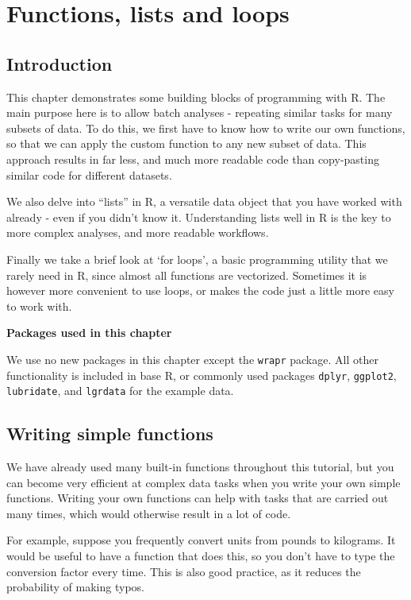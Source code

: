 \documentclass[]{book}
\begin{document}
\hypertarget{programming}{%
\chapter{Functions, lists and loops}\label{programming}}

\hypertarget{introduction-3}{%
\section{Introduction}\label{introduction-3}}

This chapter demonstrates some building blocks of programming with R. The main purpose here is to allow batch analyses - repeating similar tasks for many subsets of data. To do this, we first have to know how to write our own functions, so that we can apply the custom function to any new subset of data. This approach results in far less, and much more readable code than copy-pasting similar code for different datasets.

We also delve into ``lists'' in R, a versatile data object that you have worked with already - even if you didn't know it. Understanding lists well in R is the key to more complex analyses, and more readable workflows.

Finally we take a brief look at `for loops', a basic programming utility that we rarely need in R, since almost all functions are vectorized. Sometimes it is however more convenient to use loops, or makes the code just a little more easy to work with.

\textbf{Packages used in this chapter}

We use no new packages in this chapter except the \texttt{wrapr} package. All other functionality is included in base R, or commonly used packages \texttt{dplyr}, \texttt{ggplot2}, \texttt{lubridate}, and \texttt{lgrdata} for the example data.

\hypertarget{writefunctions}{%
\section{Writing simple functions}\label{writefunctions}}

We have already used many built-in functions throughout this tutorial, but you can become very efficient at complex data tasks when you write your own simple functions. Writing your own functions can help with tasks that are carried out many times, which would otherwise result in a lot of code.

For example, suppose you frequently convert units from pounds to kilograms. It would be useful to have a function that does this, so you don't have to type the conversion factor every time. This is also good practice, as it reduces the probability of making typos.
\end{document}
